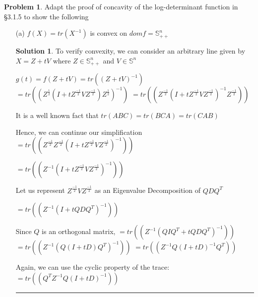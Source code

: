 \documentclass{article}
\theoremstyle{definition}
\newtheorem{problem}{Problem}
\def\fline{\rule{0.75\linewidth}{0.5pt}}
\newcommand{\finishline}{\begin{center}\fline\end{center}}
\newtheorem*{solution*}{Solution}
\newenvironment{solution}{\begin{solution*}}{{\finishline} \end{solution*}}
\begin{document}
\begin{problem}
    Adapt the proof of concavity of the log-determinant function in §3.1.5 to show the following
    \begin{itemize}
        \item[(a)] $f(X) = tr(X^{-1})$ is convex on $dom f = \mathbb{S}^n_{++}$
        \begin{solution}
            To verify convexity, we can consider an arbitrary line given by $X = Z + tV$ where $Z \in \mathbb{S}^n_{++}$ and $V \in \mathbb{S}^n$

            $g(t) = f(Z + tV) = tr((Z + tV)^{-1})$ \newline 
            $= tr((Z^{\frac{1}{2}} (I + tZ^{\frac{-1}{2}} V Z^{\frac{-1}{2}}) Z^{\frac{1}{2}})^{-1})$ \newline 
            $= tr((Z^{\frac{-1}{2}} (I + tZ^{\frac{-1}{2}} V Z^{\frac{-1}{2}})^{-1} Z^{\frac{-1}{2}}))$ \newline 

            It is a well known fact that $tr(ABC) = tr(BCA) = tr(CAB)$ \newline 

            Hence, we can continue our simplification \newline 
            $= tr((Z^{\frac{-1}{2}} Z^{\frac{-1}{2}} (I + tZ^{\frac{-1}{2}} V Z^{\frac{-1}{2}})^{-1}))$ \newline 

            $= tr((Z^{-1} (I + tZ^{\frac{-1}{2}} V Z^{\frac{-1}{2}})^{-1}))$ \newline 

            Let us represent $Z^{\frac{-1}{2}} V Z^{\frac{-1}{2}}$ as an Eigenvalue Decomposition of $QDQ^T$ \newline 
            
            $= tr((Z^{-1} (I + tQDQ^T)^{-1}))$ \newline 

            Since $Q$ is an orthogonal matrix, \newline 
            $= tr((Z^{-1} (QIQ^T + tQDQ^T)^{-1}))$ \newline 
            $= tr((Z^{-1} (Q(I + tD)Q^T)^{-1}))$ \newline 
            $= tr((Z^{-1} Q (I + tD)^{-1} Q^T))$ \newline 

            Again, we can use the cyclic property of the trace: \newline 
            $= tr((Q^TZ^{-1} Q (I + tD)^{-1}))$ \newline 


\end{solution}
\end{itemize}
\end{problem}
\end{document}
